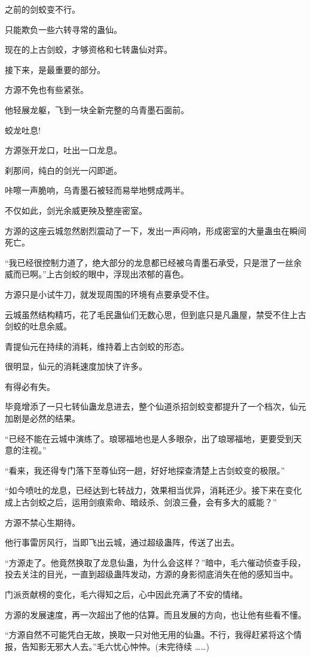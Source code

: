\begin{this_body}
之前的剑蛟变不行。

只能欺负一些六转寻常的蛊仙。

现在的上古剑蛟，才够资格和七转蛊仙对弈。

接下来，是最重要的部分。

方源不免也有些紧张。

他轻展龙躯，飞到一块全新完整的乌青墨石面前。

蛟龙吐息!

方源张开龙口，吐出一口龙息。

刹那间，纯白的剑光一闪即逝。

咔嚓一声脆响，乌青墨石被轻而易举地劈成两半。

不仅如此，剑光余威更殃及整座密室。

方源的这座云城忽然剧烈震动了一下，发出一声闷响，形成密室的大量蛊虫在瞬间死亡。

“我已经很控制力道了，绝大部分的龙息都已经被乌青墨石承受，只是泄了一丝余威而已啊。”上古剑蛟的眼中，浮现出浓郁的喜色。

方源只是小试牛刀，就发现周围的环境有点要承受不住。

云城虽然结构精巧，花了毛民蛊仙们无数心思，但到底只是凡蛊屋，禁受不住上古剑蛟的吐息余威。

青提仙元在持续的消耗，维持着上古剑蛟的形态。

很明显，仙元的消耗速度加快了许多。

有得必有失。

毕竟增添了一只七转仙蛊龙息进去，整个仙道杀招剑蛟变都提升了一个档次，仙元加剧是必然的结果。

“已经不能在云城中演练了。琅琊福地也是人多眼杂，出了琅琊福地，更要受到天意的注视。”

“看来，我还得专门落下至尊仙窍一趟，好好地探查清楚上古剑蛟变的极限。”

“如今喷吐的龙息，已经达到七转战力，效果相当优异，消耗还少。接下来在变化成上古剑蛟之后，运用剑痕索命、暗歧杀、剑浪三叠，会有多大的威能？”

方源不禁心生期待。

他行事雷厉风行，当即飞出云城，通过超级蛊阵，传送了出去。

“方源走了。他竟然换取了龙息仙蛊，为什么会这样？”暗中，毛六催动侦查手段，投去关注的目光，一直到超级蛊阵发动，方源的身影彻底消失在他的感知当中。

门派贡献榜的变化，毛六得知之后，心中因此充满了不安的情绪。

方源的发展速度，再一次超出了他的估算。而且发展的方向，也让他有些看不懂。

“方源自然不可能凭白无故，换取一只对他无用的仙蛊。不行，我得赶紧将这个情报，告知影无邪大人去。”毛六忧心忡忡。(未完待续 ……)

\end{this_body}

